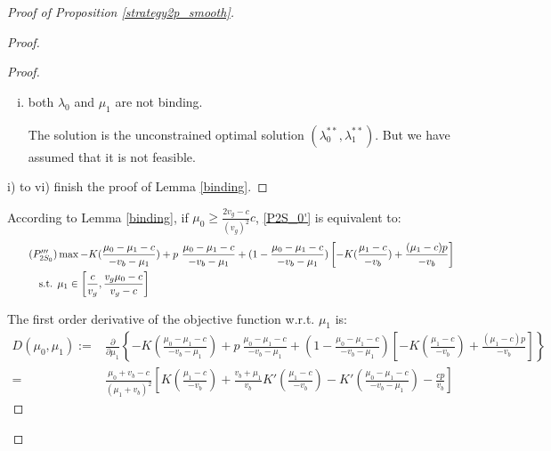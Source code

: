 \documentclass[11pt]{extarticle}
\newcommand{\ra}{\Rightarrow}
\begin{document}
\begin{proof}[Proof of Proposition \ref{strategy2p_smooth}]
\begin{enumerate}
\begin{proof}
\begin{proof}
\begin{enumerate}[i)]
					F.O.C. $\ra \begin{cases}
					-K'(\lambda_0) + p +K(\frac{\mu_1-c}{-v_b})+\frac{(\mu_1-c)p}{-v_b}+\xi = 0 \\
					(1-\lambda_0) \left[K'(\frac{\mu_1-c}{-v_b})\cdot \frac{1}{v_b}-\frac{p}{v_b}\right]+\xi \frac{1-\mu_0}{(1-\mu_1)^2} =0
					\end{cases}$
					
					Similar to the previous case, the LHS of the second equality $> 0$. A contradiction! So, this case cannot happen. 
					
					\item both $\lambda_0$ and $\mu_1$ are not binding.
					
					The solution is the unconstrained optimal solution $(\lambda_0^{**},\lambda_1^{**})$. But we have assumed that it is not feasible.
				\end{enumerate}
				
				i) to vi) finish the proof of Lemma \ref{binding}.
			\end{proof}
			
			According to Lemma \ref{binding}, if $\mu_0 \geq \frac{2v_g-c}{(v_g)^2}c$, \eqref{P2S_0'} is equivalent to:
			\footnotesize
			\begin{align}\tag{$P'''_{2S_0}$} \label{P2S_0'''}
			& \max -K(\frac{\mu_0-\mu_1-c}{-v_b-\mu_1}) + p~ \frac{\mu_0-\mu_1-c}{-v_b-\mu_1} + (1-\frac{\mu_0-\mu_1-c}{-v_b-\mu_1}) \left[-K(\frac{\mu_1-c}{-v_b})+\frac{(\mu_1-c)p}{-v_b}\right] \nonumber\\
			\text{s.t. } &\mu_1\in \left[\frac{c}{v_g}, \frac{v_g\mu_0-c}{v_g-c} \right] \nonumber
			\end{align}
			
			\normalsize
			The first order derivative of the objective function w.r.t. $\mu_1$ is:
			\footnotesize
			\begin{align*} 
			D(\mu_0, \mu_1) := &\frac{\partial}{\partial \mu_1} \left\{-K(\frac{\mu_0-\mu_1-c}{-v_b-\mu_1}) + p~ \frac{\mu_0-\mu_1-c}{-v_b-\mu_1} + (1-\frac{\mu_0-\mu_1-c}{-v_b-\mu_1}) \left[-K(\frac{\mu_1-c}{-v_b})+\frac{(\mu_1-c)p}{-v_b}\right]\right\}\\
			= &\frac{\mu_0+v_b-c}{(\mu_1+v_b)^2} \left[ K(\frac{\mu_1-c}{-v_b})+\frac{v_b+\mu_1}{v_b} K'(\frac{\mu_1-c}{-v_b})-K'(\frac{\mu_0-\mu_1-c}{-v_b-\mu_1})-\frac{cp}{v_b} \right]
			\end{align*}
			

\end{proof}
\end{enumerate}
\end{proof}
\end{document}
